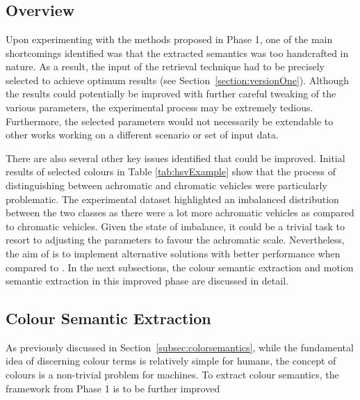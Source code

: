 \section{\versionTwoExt}
\label{section:semantic_chamfer}

\vspace{1em}
\subsection{Overview}

Upon experimenting with the methods proposed in Phase 1, one of the main shortcomings identified was that the extracted semantics was too handcrafted in nature.
As a result, the input of the retrieval technique had to be precisely selected to achieve optimum results (see Section~\ref{section:versionOne}).
Although the results could potentially be improved with further careful tweaking of the various parameters, the experimental process may be extremely tedious.
Furthermore, the selected parameters would not necessarily be extendable to other works working on a different scenario or set of input data.

There are also several other key issues identified that could be improved.
Initial results of selected colours in Table \ref{tab:hsvExample} show that the process of distinguishing between achromatic and chromatic vehicles were particularly problematic.
The experimental dataset highlighted an imbalanced distribution between the two classes as there were a lot more achromatic vehicles as compared to chromatic vehicles.
Given the state of imbalance, it could be a trivial task to resort to adjusting the parameters to favour the achromatic scale.
Nevertheless, the aim of \versionTwoExt is to implement alternative solutions with better performance when compared to \versionOneExt. In the next subsections, the colour semantic extraction and motion semantic extraction in this improved phase are discussed in detail.


\vspace{1em}
\subsection{Colour Semantic Extraction}
\label{section:versiontwoColor}
As previously discussed in Section~\ref{subsec:colorsemantics}, while the fundamental idea of discerning colour terms is relatively simple for humans, the concept of colours is a non-trivial problem for machines. To extract colour semantics, the framework from Phase 1 is to be further improved

